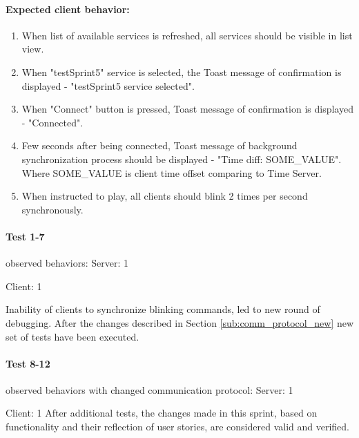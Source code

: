 \paragraph{Expected client behavior:}
\begin{enumerate}
\item When list of available services is refreshed, all services should be visible in list view.
\item When "testSprint5" service is selected, the Toast message of confirmation is displayed - "testSprint5 service selected".
\item When "Connect" button is pressed, Toast message of confirmation is displayed - "Connected".
\item Few seconds after being connected, Toast message of background synchronization process should be displayed - "Time diff: SOME\_VALUE". Where SOME\_VALUE is client time offset comparing to Time Server.
\item When instructed to play, all clients should blink 2 times per second synchronously. 
\end{enumerate}

\paragraph{Test 1-7 } observed behaviors:
\newline \newline Server:
1    \tick

Client:
1     \cross

Inability of clients to synchronize blinking commands, led to new round of debugging. After the changes described in Section \ref{sub:comm_protocol_new} new set of tests have been executed. 

\paragraph{Test 8-12 } observed behaviors with changed communication protocol:
\newline \newline Server:
1    \tick

Client:
1     \tick
\newline
After additional tests, the changes made in this sprint, based on functionality and their reflection of user stories, are considered valid and verified. 

